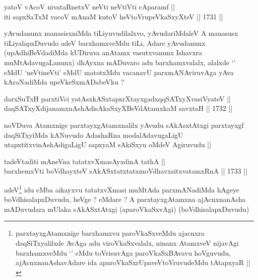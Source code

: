 \begin{shl}
yatoV vAcoV nivataRnetxV neVti neVtiVti cAparamf || \\
iti sapxSaTxM vacoV mAnaM kutoV heVtoVrupeVkaSxyXteV ||  1731 ||  
\end{shl}

\begin{artha}
yAvudanunx manasisxniMda tiLiyuvudilalxvo, yAvudariMdaleV A manasusx
tiLiyalapxDuvudo adeV barxhamxveMdu tiLi, Adare yAvudanunx
(upAdhiBeVdadiMda kUDiruva anAtamx vasutxvanunx Ishavxra
muMtAdavugaLanunx) dhAyxna mADuvaro adu barxhamxvalalx, alalxde
`\stext' eMdU `neVtineVti' eMdU matotxMdu vacanavU parxmANAviruvAga
yAva kAraNadiMda upeVkeSxmADabeVku ?
\end{artha}


\begin{shl}
darxSuTxH parxtiVci yatAsxkASxtapxrXtayxgadxqqSATxyX\s vasiVyateV ||  \\
daqSATxyXdijanamxnAshAdisAkaSxyXBeVdAtamxkaM savxtaH ||  1732 ||  
\end{shl}

\begin{artha}
noVDuva Atamxnige parxtayxgAtamxnalilx yAvudu sAkAsxtAtxgi parxtayxgf
daqSiTxyiMda kANuvudo AdashaRna modalAdavugaLigU
utapxtitxvinAshAdigaLigU sapxyaM sAkiSxyu oMdeV Agiruvudu ||
\end{artha}

\begin{shl}
tadeVtaditi mAneVna tatatxvXmasAyxdinA tathA || \\
barxhemxVti boVdhayxteV sAkASxtatxtatxmoVdhavxsitxvatamxRnA ||  1733 ||  
\end{shl}

\begin{artha}
adeV\footnote[1]{parxtayxgAtamxnige barxhamxvu paroVkaSxveMdu ajacnxra
  daqSiTxyalilxde AvAga adu viroVkaSxvalalx, ninanx AtamxveV nijavAgi
  barxhamxveMdu `\stext' eMdu toVrisuvAga paroVkaSxBAvavu hoVguvudu,
  ajAcnxnanAshavAdare ida aparoVkaSxrUpaveVtoVruvudeMdu tAtapxyaR ||} idu eMba aikayxvu tatatxvXmasi muMtAda parxmANadiMda
hAgeye boVdhisalapxDuvudu, heVge ? eMdare ? A parxtayxgAtamxna
ajAcnxnanAsha mADuvudara mUlaka sAkASxtAtxgi (aparoVkaSxvAgi)
(boVdhisalapxDuvudu)
\end{artha}


